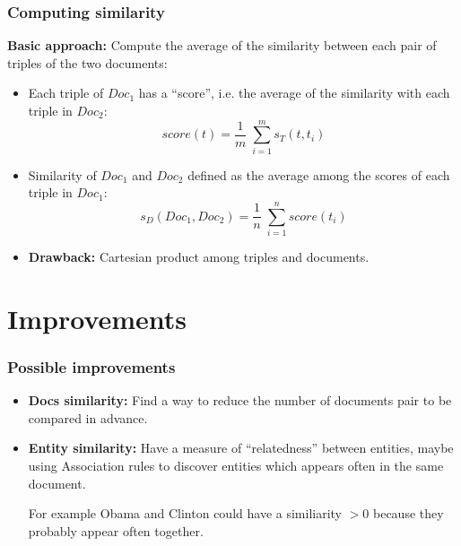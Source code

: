 \documentclass{beamer}
\begin{document}
\begin{frame}
\frametitle{Computing similarity}
{\bf Basic approach:} Compute the average of the similarity between
each pair of triples of the two documents:
\begin{itemize}
\item Each triple of $Doc_{1}$ has a ``score'', i.e. the average of the
  similarity with each triple in $Doc_{2}$:
$$
score (t) = \frac{1}{m} \; \sum^{m}_{i = 1} s_{T} (t, t_{i})
$$
\item Similarity of $Doc_{1}$ and $Doc_{2}$ defined as the average among the
  scores of each triple in $Doc_{1}$:
$$
s_{D} (Doc_{1}, Doc_{2}) = \frac{1}{n} \; \sum^{n}_{i = 1} score (t_{i})
$$
\item {{\bf Drawback:}} Cartesian product among triples and documents.
\end{itemize}
\end{frame}

\section{Improvements}
\begin{frame}
\frametitle{Possible improvements}
\begin{itemize}
\item{{\bf Docs similarity:}} Find a way to reduce the number of
  documents pair to be compared in advance.
\item{{\bf Entity similarity:}} Have a measure of ``relatedness''
  between entities, maybe using Association rules to discover entities
  which appears often in the same document.

  For example Obama and Clinton could have a similiarity $> 0$ because
  they probably appear often together.

\end{itemize}
\end{frame}
\end{document}
